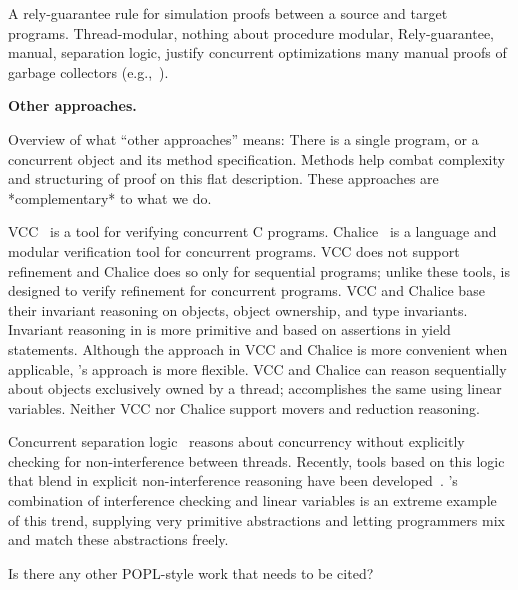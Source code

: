 A rely-guarantee rule for simulation proofs between a source and
target programs. 
Thread-modular, nothing about procedure modular, 
Rely-guarantee, manual, separation logic, justify concurrent optimizations
many manual proofs of garbage collectors (e.g.,~\cite{LiangRGSim}). 


{\bf Other approaches.}

Overview of what ``other approaches'' means: There is a single
program, or a concurrent object and its method specification. Methods
help combat complexity and structuring of proof on this flat
description. These approaches are *complementary* to what we do.

VCC~\cite{VCC} is a tool for verifying concurrent C programs.  
Chalice~\cite{LM09} is a language and modular verification tool for concurrent programs. 
VCC does not support refinement and Chalice does so only for sequential programs;
unlike these tools, \civl is designed to verify refinement for concurrent programs.  
VCC and Chalice base their invariant reasoning on objects, object ownership, and type invariants. 
Invariant reasoning in \civl is more primitive and based on assertions in yield statements. 
Although the approach in VCC and Chalice is more convenient when applicable, \civl's approach is more flexible. 
VCC and Chalice can reason sequentially about objects exclusively owned by a thread;
\civl accomplishes the same using linear variables.
Neither VCC nor Chalice support movers and reduction reasoning.

Concurrent separation logic~\cite{OHearn07} reasons about concurrency without 
explicitly checking for non-interference between threads. 
Recently, tools based on this logic that blend in explicit non-interference reasoning have been developed~\cite{SAGL,RGSep}. 
\civl's combination of interference checking and linear variables is an extreme example of this trend,
supplying very primitive abstractions and letting programmers mix and match these abstractions freely.

Is there any other POPL-style work that needs to be cited?


